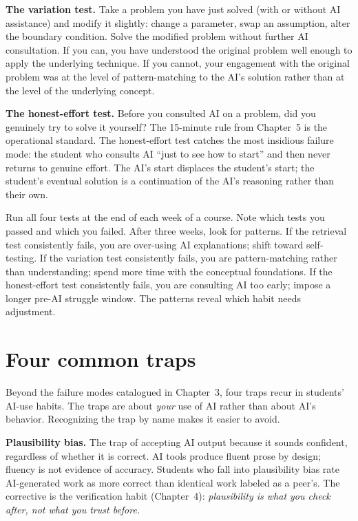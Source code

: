 \documentclass[11pt]{book}
\begin{document}
\textbf{The variation test.} Take a problem you have just solved (with or without AI assistance) and modify it slightly: change a parameter, swap an assumption, alter the boundary condition. Solve the modified problem without further AI consultation. If you can, you have understood the original problem well enough to apply the underlying technique. If you cannot, your engagement with the original problem was at the level of pattern-matching to the AI's solution rather than at the level of the underlying concept.

\textbf{The honest-effort test.} Before you consulted AI on a problem, did you genuinely try to solve it yourself? The 15-minute rule from Chapter~5 is the operational standard. The honest-effort test catches the most insidious failure mode: the student who consults AI ``just to see how to start'' and then never returns to genuine effort. The AI's start displaces the student's start; the student's eventual solution is a continuation of the AI's reasoning rather than their own.

\begin{tryit}
Run all four tests at the end of each week of a course. Note which tests you passed and which you failed. After three weeks, look for patterns. If the retrieval test consistently fails, you are over-using AI explanations; shift toward self-testing. If the variation test consistently fails, you are pattern-matching rather than understanding; spend more time with the conceptual foundations. If the honest-effort test consistently fails, you are consulting AI too early; impose a longer pre-AI struggle window. The patterns reveal which habit needs adjustment.
\end{tryit}

\section{Four common traps}

Beyond the failure modes catalogued in Chapter~3, four traps recur in students' AI-use habits. The traps are about \emph{your} use of AI rather than about AI's behavior. Recognizing the trap by name makes it easier to avoid.

\textbf{Plausibility bias.} The trap of accepting AI output because it sounds confident, regardless of whether it is correct. AI tools produce fluent prose by design; fluency is not evidence of accuracy. Students who fall into plausibility bias rate AI-generated work as more correct than identical work labeled as a peer's. The corrective is the verification habit (Chapter~4): \emph{plausibility is what you check after, not what you trust before.}
\end{document}
